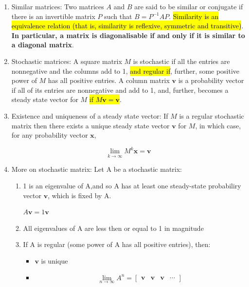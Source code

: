 \documentclass{article}
\begin{document}
\begin{enumerate}
\begin{enumerate}
            \end{enumerate}

        \item Similar matrices: Two matrices $A$ and $B$ are said to be similar or conjugate if there is an invertible matrix $P$ such that $B=P^{-1} A P$. \hl{Similarity is an equivalence relation (that is, similarity is reflexive, symmetric and transitive)}. \textbf{In particular, a matrix is diagonalisable if and only if it is similar to a diagonal matrix}.

        \item Stochastic matrices: A square matrix $M$ is stochastic if all the entries are nonnegative and the columns add to 1, \hl{and regular if}, further, some positive power of $M$ has all positive entries. A column matrix $\mathbf{v}$ is a probability vector if all of its entries are nonnegative and add to 1, and, further, becomes a steady state vector for $M$ \hl{if $M \mathbf{v}=\mathbf{v}$}.

        \item Existence and uniqueness of a steady state vector: If $M$ is a regular stochastic matrix then there exists a unique steady state vector $\mathbf{v}$ for $M$, in which case, for any probability vector $\mathbf{x}$,

            $$
            \lim _{k \rightarrow \infty} M^{k} \mathbf{x}=\mathbf{v}
            $$

        \item More on stochastic matrix:
            Let A be a stochastic matrix:
            \begin{enumerate}
                \item 1 is an eigenvalue of A,and so A has at least one steady-state probabiliry vector $\textbf{v}$, which is fixed by A.
                    \begin{center}
                        $A\textbf{v} = 1 \textbf{v}$
                    \end{center}

                \item All eigenvalues of A are less then or equal to 1 in magnitude

                \item If A is regular (some power of A has all positive entries), then:
                    \begin{itemize}
                        \item $\textbf{v}$ is unique
                        \item             
                            $$
                            \lim _{n \rightarrow \infty} A^{n} = \begin{bmatrix} \textbf{v} & \textbf{v} & \textbf{v} & \cdots \end{bmatrix}
                            $$


\end{itemize}
\end{enumerate}
\end{enumerate}
\end{document}
